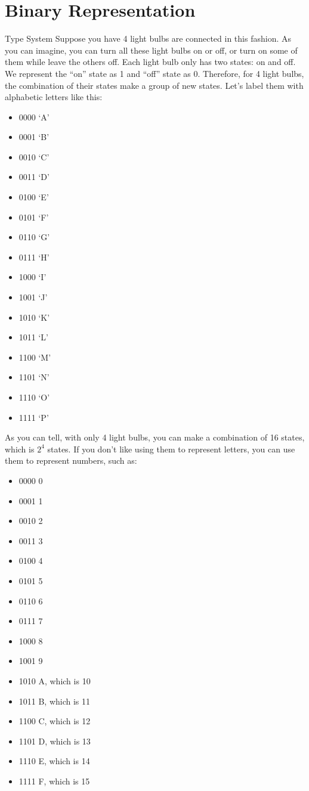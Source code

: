 \documentclass[../main.tex]{subfiles}
\begin{document}
    \section{Binary Representation}
    Type System
Suppose you have 4 light bulbs are connected in this fashion. As you can imagine,
you can turn all these light bulbs on or off, or turn on some of them while leave
the others off. Each light bulb only has two states: on and off. We represent the
``on'' state as 1 and ``off'' state as 0. Therefore, for 4 light bulbs, the
combination of their states make a group of new states. Let's label them with
alphabetic letters like this:
\begin{itemize}
    \item 0000 `A'
    \item 0001 `B'
    \item 0010 `C'
    \item 0011 `D'
    \item 0100 `E'
    \item 0101 `F'
    \item 0110 `G'
    \item 0111 `H'
    \item 1000 `I'
    \item 1001 `J'
    \item 1010 `K'
    \item 1011 `L'
    \item 1100 `M'
    \item 1101 `N'
    \item 1110 `O'
    \item 1111 `P'
\end{itemize}

As you can tell, with only 4 light bulbs, you can make a combination of 16
states, which is \(2^4\) states. If you don't like using them to represent letters,
you can use them to represent numbers, such as:

\begin{itemize}
    \item 0000 0
    \item 0001 1
    \item 0010 2
    \item 0011 3
    \item 0100 4
    \item 0101 5
    \item 0110 6
    \item 0111 7
    \item 1000 8
    \item 1001 9
    \item 1010 A, which is 10
    \item 1011 B, which is 11
    \item 1100 C, which is 12
    \item 1101 D, which is 13
    \item 1110 E, which is 14
    \item 1111 F, which is 15
\end{itemize}
\end{document}
